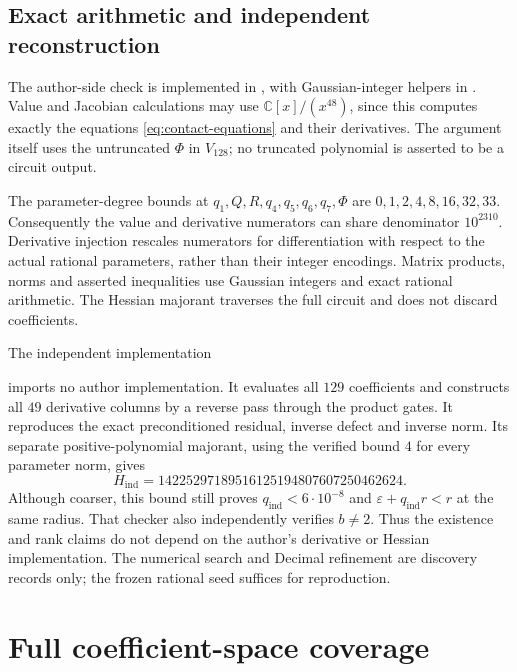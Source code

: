 \documentclass[11pt]{article}
\newcommand{\C}{\mathbb C}
\begin{document}
\subsection{Exact arithmetic and independent reconstruction}

The author-side check is implemented in
, with Gaussian-integer
helpers in .
Value and Jacobian calculations may use $\C[x]/(x^{48})$, since this
computes exactly the equations \eqref{eq:contact-equations} and their
derivatives. The argument itself uses the untruncated $\Phi$ in
$V_{128}$; no truncated polynomial is asserted to be a circuit output.

The parameter-degree bounds at $q_1,Q,R,q_4,q_5,q_6,q_7,\Phi$ are
$0,1,2,4,8,16,32,33$. Consequently the value and derivative numerators
can share denominator $10^{2310}$. Derivative injection rescales
numerators for differentiation with respect to the actual rational
parameters, rather than their integer encodings. Matrix products, norms
and asserted inequalities use Gaussian integers and exact rational
arithmetic. The Hessian majorant traverses the full circuit and does not
discard coefficients.

The independent implementation
\begin{center}
\end{center}
imports no author implementation. It evaluates all $129$ coefficients and constructs all
$49$ derivative columns by a reverse pass through the product gates.
It reproduces the exact preconditioned residual, inverse defect and
inverse norm. Its separate positive-polynomial majorant, using the
verified bound $4$ for every parameter norm, gives
\begin{equation}\label{eq:independent-hessian}
 H_{\mathrm{ind}}=14225297189516125194807607250462624.
\end{equation}
Although coarser, this bound still proves $q_{\mathrm{ind}}<6\cdot10^{-8}$
and $\varepsilon+q_{\mathrm{ind}}r<r$ at the same radius. That checker
also independently verifies $b\ne2$. Thus the existence and rank claims
do not depend on the author's derivative or Hessian implementation.
The numerical search and Decimal refinement are discovery records only;
the frozen rational seed suffices for reproduction.

\section{Full coefficient-space coverage}\label{sec:coverage}
\end{document}
